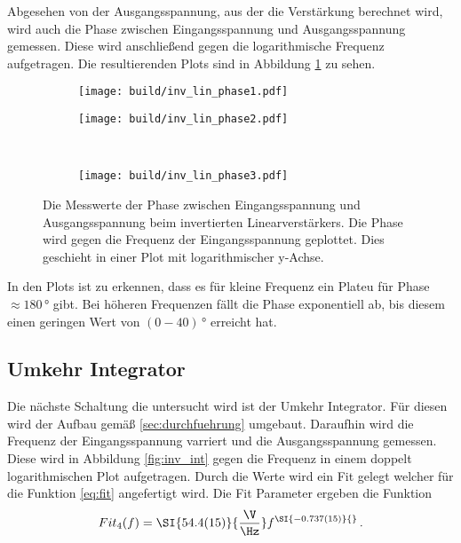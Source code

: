Abgesehen von der Ausgangsspannung, aus der die Verstärkung berechnet wird, wird auch die Phase zwischen Eingangsspannung und Ausgangsspannung gemessen.
Diese wird anschließend gegen die logarithmische  Frequenz aufgetragen.
Die resultierenden Plots sind in Abbildung \ref{fig:phase} zu sehen.
\begin{figure}
    \centering
    \begin{subfigure}{0.49\linewidth}%
        \texttt{[image: build/inv\_lin\_phase1.pdf]}
    \end{subfigure}
    \hfill
    \begin{subfigure}{0.49\linewidth}%
        \texttt{[image: build/inv\_lin\_phase2.pdf]}
    \end{subfigure}\\
    \begin{subfigure}{0.49\linewidth}%
        \texttt{[image: build/inv\_lin\_phase3.pdf]}
    \end{subfigure}
    \caption{Die Messwerte der Phase zwischen Eingangsspannung und Ausgangsspannung beim invertierten Linearverstärkers. Die Phase wird gegen die Frequenz der Eingangsspannung geplottet.
    Dies geschieht in einer Plot mit logarithmischer y-Achse.}
    \label{fig:phase}
\end{figure}
In den Plots ist zu erkennen, dass es für kleine Frequenz ein Plateu für Phase $\approx 180\,\si{\degree}$ gibt.
Bei höheren Frequenzen fällt die Phase exponentiell ab, bis diesem einen geringen Wert von $(0-40)\,\si{\degree}$ erreicht hat.

\subsection{Umkehr Integrator}
Die nächste Schaltung die untersucht wird ist der Umkehr Integrator.
Für diesen wird der Aufbau gemäß \ref{sec:durchfuehrung} umgebaut.
Daraufhin wird die Frequenz der Eingangsspannung varriert und die Ausgangsspannung gemessen.
Diese wird in Abbildung \ref{fig:inv_int} gegen die Frequenz in einem doppelt logarithmischen Plot aufgetragen.
Durch die Werte wird ein Fit gelegt welcher für die Funktion \eqref{eq:fit} angefertigt wird.
Die Fit Parameter ergeben die Funktion
\begin{align*}
    Fit_4(f) = \SI{54.4(15)}{\frac{\V}{\Hz}} f^{\SI{-0.737(15)}{}} \, .
\end{align*}

